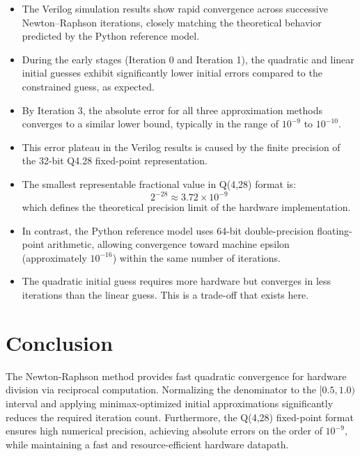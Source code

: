 \documentclass{article}
\begin{document}
\begin{itemize}
    \item The Verilog simulation results show rapid convergence across successive Newton--Raphson iterations, closely matching the theoretical behavior predicted by the Python reference model.
    \item During the early stages (Iteration 0 and Iteration 1), the quadratic and linear initial guesses exhibit significantly lower initial errors compared to the constrained guess, as expected.
    \item By Iteration 3, the absolute error for all three approximation methods converges to a similar lower bound, typically in the range of $10^{-9}$ to $10^{-10}$.
    \item This error plateau in the Verilog results is caused by the finite precision of the 32-bit Q4.28 fixed-point representation.
    \item The smallest representable fractional value in Q(4,28) format is:
    \[
        2^{-28} \approx 3.72 \times 10^{-9}
    \]
    which defines the theoretical precision limit of the hardware implementation.
    \item In contrast, the Python reference model uses 64-bit double-precision floating-point arithmetic, allowing convergence toward machine epsilon (approximately $10^{-16}$) within the same number of iterations.
     \item The quadratic initial guess requires more hardware but converges in less iterations than the linear guess. This is a trade-off that exists here.
\end{itemize}

\section{Conclusion}
The Newton-Raphson method provides fast quadratic convergence for hardware division via reciprocal computation. Normalizing the denominator to the $[0.5, 1.0)$ interval and applying minimax-optimized initial approximations significantly reduces the required iteration count. Furthermore, the Q(4,28) fixed-point format ensures high numerical precision, achieving absolute errors on the order of $10^{-9}$, while maintaining a fast and resource-efficient hardware datapath.
\end{document}
